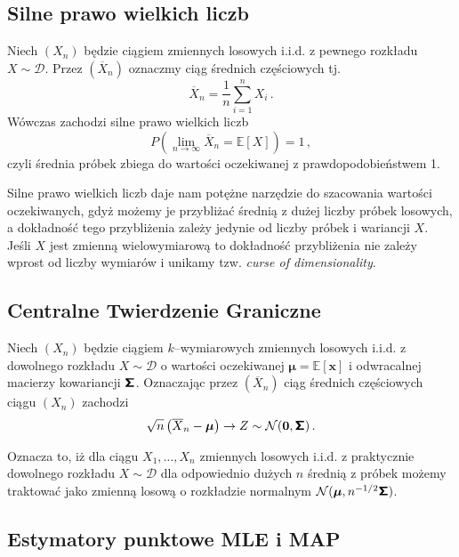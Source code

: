 \documentclass{myclass}
\begin{document}
\subsection{Silne prawo wielkich liczb}

Niech \((X_n)\) będzie ciągiem zmiennych losowych i.i.d. z pewnego rozkładu \(X \sim \mathcal{D}\).
Przez \((\overline{X}_n)\) oznaczmy ciąg średnich częściowych tj.
\begin{equation*}
    \overline{X}_n = \frac{1}{n}\sum_{i=1}^n X_i\,.
\end{equation*}
Wówczas zachodzi silne prawo wielkich liczb
\begin{equation*}
    P\left(\lim_{n\to\infty} \overline{X}_n = \mathbb{E}[X]\right) = 1\,,
\end{equation*}
czyli średnia próbek zbiega do wartości oczekiwanej z prawdopodobieństwem 1.

Silne prawo wielkich liczb daje nam potężne narzędzie do szacowania wartości oczekiwanych, gdyż
możemy je przybliżać średnią z dużej liczby próbek losowych, a dokładność tego przybliżenia zależy
jedynie od liczby próbek i wariancji \(X\). Jeśli \(X\) jest zmienną wielowymiarową to dokładność
przybliżenia nie zależy wprost od liczby wymiarów i unikamy tzw. \textit{curse of dimensionality}.

\subsection{Centralne Twierdzenie Graniczne}

Niech \((X_n)\) będzie ciągiem \(k\)--wymiarowych zmiennych losowych i.i.d. z dowolnego rozkładu \(X
\sim \mathcal{D}\) o wartości oczekiwanej \(\boldsymbol{\mu} = \mathbb{E}[\mathbf{x}]\) i
odwracalnej macierzy kowariancji \(\boldsymbol{\mathsf{\Sigma}}\). Oznaczając przez \((\overline{X}_n)\) ciąg
średnich częściowych ciągu \((X_n)\) zachodzi
\begin{equation*}
    \sqrt{n}\left(\overline{X}_n - \boldsymbol{\mu}\right) \to Z \sim \mathcal{N}(\mathbf{0}, \boldsymbol{\mathsf{\Sigma}})\,.
\end{equation*}

Oznacza to, iż dla ciągu \(X_1,\ldots,X_n\) zmiennych losowych i.i.d. z praktycznie dowolnego
rozkładu \(X\sim\mathcal{D}\) dla odpowiednio dużych \(n\) średnią z próbek możemy traktować jako
zmienną losową o rozkładzie normalnym \(\mathcal{N}(\boldsymbol{\mu}, n^{-1/2}\boldsymbol{\mathsf{\Sigma}})\).


\subsection{Estymatory punktowe MLE i MAP}
\end{document}
